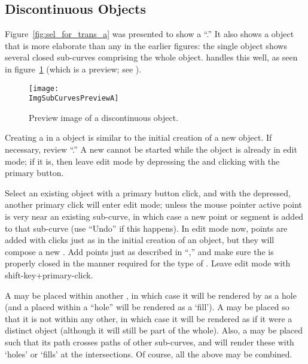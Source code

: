 		\subsection{Discontinuous Objects}%
		\label{ssec:discont_objects}
		Figure~\ref{fig:sel_for_trans_a} was presented to
		show a
		``.''
		It also shows a \IXspline{} object that is more
		elaborate than any in the earlier figures:
		the single object shows several closed sub-curves
		comprising the whole object.
		\IXpov{} handles this well, as
		seen in figure~\ref{fig:subcurves_1}
		(which is a \IXpov{} preview;
		see ).

		\begin{figure}[htb!]
		\centering
		\texttt{[image: \\ImgSubCurvesPreviewA]}
		\caption{Preview image of a discontinuous object.}
		\label{fig:subcurves_1}
		\end{figure}
		
		Creating a  in a
		\IXspline{} object is similar
		to the initial creation of a new \IXspline{} object.
		If necessary, review
		``.''
		A new  cannot be started while
		the object is already in edit mode; if it is,
		then leave edit mode by depressing the 
		 and clicking with the primary button.
		
		Select an existing object with a primary button
		click, and with the  
		depressed, another primary click will enter
		edit mode; unless the mouse pointer active point
		is very near an existing sub-curve, in which
		case a new point or segment is added to that
		sub-curve (use ``Undo'' if this happens).
		In edit mode now, points are added with clicks
		just as in the initial creation of an object,
		but they will compose a new .
		Add points just as described in
		``,'' and make
		sure the  is properly closed
		in the manner required for the type of \IXspline{}.
		Leave edit mode with shift-key+primary-click.
		
		A  may be placed within another
		, in which case it will be
		rendered by \IXpov{} as a hole (and a
		 placed within a ``hole''
		will be rendered as a `fill').
		A  may be placed so that it
		is not within any other, in which case it will be
		rendered as if it were a distinct object
		(although it will still be part of the whole).
		Also, a  may be placed such
		that its path crosses paths of other sub-curves,
		and \IXpov{} will render these with `holes'
		or `fills' at the intersections. Of course,
		all the above may be combined.

